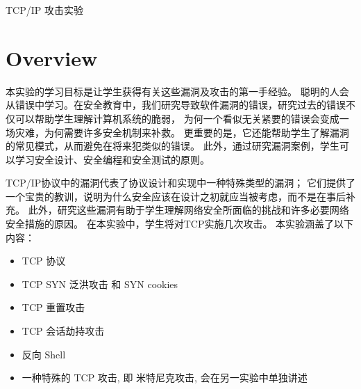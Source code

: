 

\newcommand{\commonfolder}{../../common-files}





\newcommand{\telnet} {\texttt{telnet}\xspace}
\newcommand{\tcpFigs}{./Figs}




\setcounter{task}{1}
\newcommand{\mytask} {\bf {\noindent \arabic{task}} \addtocounter{task}{1} \,}



\begin{center}
{\LARGE TCP/IP 攻击实验}
\end{center}




\section{Overview}

本实验的学习目标是让学生获得有关这些漏洞及攻击的第一手经验。
聪明的人会从错误中学习。在安全教育中，我们研究导致软件漏洞的错误，研究过去的错误不仅可以帮助学生理解计算机系统的脆弱，
为何一个看似无关紧要的错误会变成一场灾难，为何需要许多安全机制来补救。
更重要的是，它还能帮助学生了解漏洞的常见模式，从而避免在将来犯类似的错误。
此外，通过研究漏洞案例，学生可以学习安全设计、安全编程和安全测试的原则。


TCP/IP协议中的漏洞代表了协议设计和实现中一种特殊类型的漏洞；
它们提供了一个宝贵的教训，说明为什么安全应该在设计之初就应当被考虑，而不是在事后补充。
此外，研究这些漏洞有助于学生理解网络安全所面临的挑战和许多必要网络安全措施的原因。
在本实验中，学生将对TCP实施几次攻击。
本实验涵盖了以下内容：

\begin{itemize}[noitemsep]
\item TCP 协议
\item TCP SYN 泛洪攻击 和 SYN cookies 
\item TCP 重置攻击
\item TCP 会话劫持攻击
\item 反向 Shell
\item 一种特殊的 TCP 攻击, 即 米特尼克攻击, 会在另一实验中单独讲述
\end{itemize}


